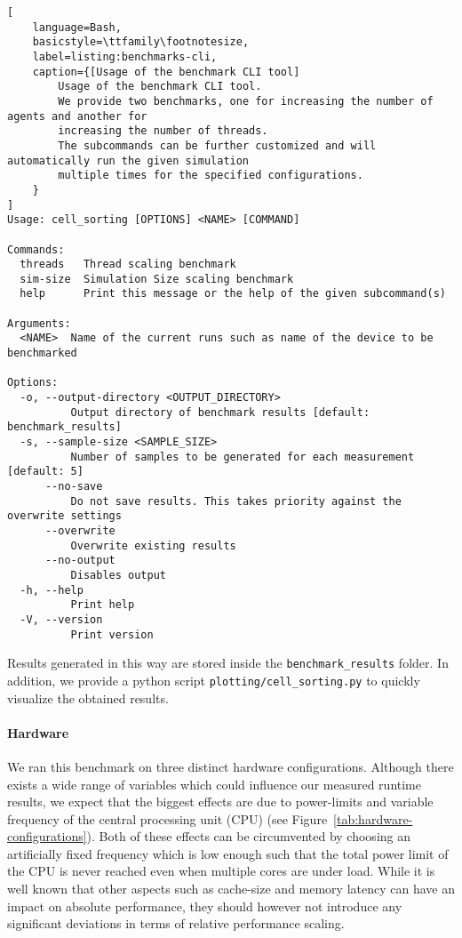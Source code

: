 \begin{minipage}{\linewidth}\begin{lstlisting}[
    language=Bash,
    basicstyle=\ttfamily\footnotesize,
    label=listing:benchmarks-cli,
    caption={[Usage of the benchmark CLI tool]
        Usage of the benchmark CLI tool.
        We provide two benchmarks, one for increasing the number of agents and another for
        increasing the number of threads.
        The subcommands can be further customized and will automatically run the given simulation
        multiple times for the specified configurations.
    }
]
Usage: cell_sorting [OPTIONS] <NAME> [COMMAND]

Commands:
  threads   Thread scaling benchmark
  sim-size  Simulation Size scaling benchmark
  help      Print this message or the help of the given subcommand(s)

Arguments:
  <NAME>  Name of the current runs such as name of the device to be benchmarked

Options:
  -o, --output-directory <OUTPUT_DIRECTORY>
          Output directory of benchmark results [default: benchmark_results]
  -s, --sample-size <SAMPLE_SIZE>
          Number of samples to be generated for each measurement [default: 5]
      --no-save
          Do not save results. This takes priority against the overwrite settings
      --overwrite
          Overwrite existing results
      --no-output
          Disables output
  -h, --help
          Print help
  -V, --version
          Print version
\end{lstlisting}\end{minipage}

Results generated in this way are stored inside the \texttt{benchmark\_results} folder.
In addition, we provide a python script \texttt{plotting/cell\_sorting.py} to quickly visualize
the obtained results.

\paragraph{Hardware}
We ran this benchmark on three distinct hardware configurations.
Although there exists a wide range of variables which could influence our measured runtime results,
we expect that the biggest effects are due to power-limits and variable frequency of the
central processing unit (CPU) (see Figure~\ref{tab:hardware-configurations}).
Both of these effects can be circumvented by choosing an artificially fixed frequency which is low
enough such that the total power limit of the CPU is never reached even when multiple cores are
under load.
While it is well known that other aspects such as cache-size and memory latency can have an impact
on absolute performance, they should however not introduce any significant deviations in terms of
relative performance scaling.

